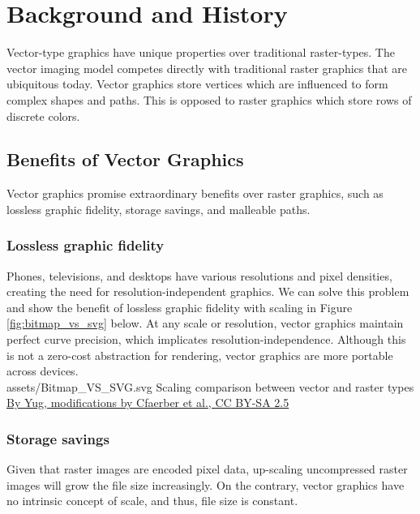 \section{Background and History}
Vector-type graphics have unique properties over traditional raster-types. The vector imaging model competes directly with traditional raster graphics that are ubiquitous today. Vector graphics store vertices which are influenced to form complex shapes and paths. This is opposed to raster graphics which store rows of discrete colors.\\

\subsection{Benefits of Vector Graphics}
Vector graphics promise extraordinary benefits over raster graphics, such as lossless graphic fidelity, storage savings, and malleable paths.\\

\subsubsection{Lossless graphic fidelity}
Phones, televisions, and desktops have various resolutions and pixel densities, creating the need for resolution-independent graphics. We can solve this problem and show the benefit of lossless graphic fidelity with scaling in Figure \ref{fig:bitmap_vs_svg} below. At any scale or resolution, vector graphics maintain perfect curve precision, which implicates resolution-independence. Although this is not a zero-cost abstraction for rendering, vector graphics are more portable across devices.\\

\svg
{assets/Bitmap_VS_SVG.svg}
{\label{fig:bitmap_vs_svg}Scaling comparison between vector and raster types}
{\href{https://commons.wikimedia.org/w/index.php?curid=1183592}{By Yug, modifications by Cfaerber et al., CC BY-SA 2.5}}

\subsubsection{Storage savings}
Given that raster images are encoded pixel data, up-scaling uncompressed raster images will grow the file size increasingly. On the contrary, vector graphics have no intrinsic concept of scale, and thus, file size is constant.\\

